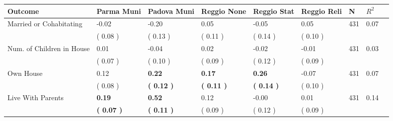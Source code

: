 \begin{tabular}{L{6.2cm} C{1.8cm} C{1.8cm} C{1.8cm} C{1.8cm} C{1.8cm} C{1.8cm} C{0.3cm} C{0.3cm}}
\toprule
 \textbf{Outcome} & \textbf{Parma Muni} & \textbf{Padova Muni} & \textbf{Reggio None} & \textbf{Reggio Stat} & \textbf{Reggio Reli} & \textbf{N} & \textbf{$ R^2$} \\
\midrule
Married or Cohabitating &     -0.02 &     -0.20 &      0.05 &     -0.05 &      0.05  & 431 &       0.07 \\ 
 & (     0.08 ) & (     0.13 ) & (     0.11 ) & (     0.14 ) & (     0.10 )  & \\
Num. of Children in House &      0.01 &     -0.04 &      0.02 &     -0.02 &     -0.01  & 431 &       0.03 \\ 
 & (     0.07 ) & (     0.10 ) & (     0.09 ) & (     0.12 ) & (     0.09 )  & \\
Own House &      0.12 & \textbf{     0.22} & \textbf{     0.17} & \textbf{     0.26} &     -0.07  & 431 &       0.07 \\ 
 & (     0.08 ) & \textbf{(     0.12 )} & \textbf{(     0.11 )} & \textbf{(     0.14 )} & (     0.10 )  & \\
Live With Parents & \textbf{     0.19} & \textbf{     0.52} &      0.12 &     -0.00 &      0.01  & 431 &       0.14 \\ 
 & \textbf{(     0.07 )} & \textbf{(     0.11 )} & (     0.09 ) & (     0.12 ) & (     0.09 )  & \\
\bottomrule
\end{tabular}
